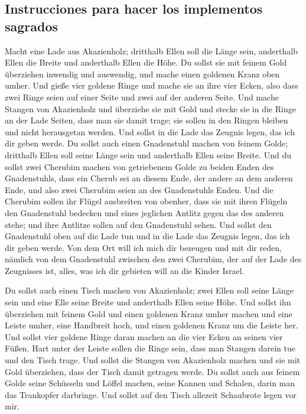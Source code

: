 \hypertarget{instrucciones-para-hacer-los-implementos-sagrados}{%
\subsection{Instrucciones para hacer los implementos
sagrados}\label{instrucciones-para-hacer-los-implementos-sagrados}}

 Macht eine Lade aus Akazienholz; dritthalb Ellen soll
die Länge sein, anderthalb Ellen die Breite und anderthalb Ellen die
Höhe.  Du sollst sie mit feinem Gold überziehen inwendig
und auswendig, und mache einen goldenen Kranz oben umher.
 Und gieße vier goldene Ringe und mache sie an ihre vier
Ecken, also dass zwei Ringe seien auf einer Seite und zwei auf der
anderen Seite.  Und mache Stangen von Akazienholz und
überziehe sie mit Gold  und stecke sie in die Ringe an
der Lade Seiten, dass man sie damit trage;  sie sollen in
den Ringen bleiben und nicht herausgetan werden.  Und
sollst in die Lade das Zeugnis legen, das ich dir geben werde.
 Du sollst auch einen Gnadenstuhl machen von feinem
Golde; dritthalb Ellen soll seine Länge sein und anderthalb Ellen seine
Breite.  Und du sollst zwei Cherubim machen von
getriebenem Golde zu beiden Enden des Gnadenstuhls,  dass
ein Cherub sei an diesem Ende, der andere an dem anderen Ende, und also
zwei Cherubim seien an des Gnadenstuhls Enden.  Und die
Cherubim sollen ihr Flügel ausbreiten von obenher, dass sie mit ihren
Flügeln den Gnadenstuhl bedecken und eines jeglichen Antlitz gegen das
des anderen stehe; und ihre Antlitze sollen auf den Gnadenstuhl sehen.
 Und sollst den Gnadenstuhl oben auf die Lade tun und in
die Lade das Zeugnis legen, das ich dir geben werde.  Von
dem Ort will ich mich dir bezeugen und mit dir reden, nämlich von dem
Gnadenstuhl zwischen den zwei Cherubim, der auf der Lade des Zeugnisses
ist, alles, was ich dir gebieten will an die Kinder Israel.

 Du sollst auch einen Tisch machen von Akazienholz; zwei
Ellen soll seine Länge sein und eine Elle seine Breite und anderthalb
Ellen seine Höhe.  Und sollst ihn überziehen mit feinem
Gold und einen goldenen Kranz umher machen  und eine
Leiste umher, eine Handbreit hoch, und einen goldenen Kranz um die
Leiste her.  Und sollst vier goldene Ringe daran machen
an die vier Ecken an seinen vier Füßen.  Hart unter der
Leiste sollen die Ringe sein, dass man Stangen darein tue und den Tisch
trage.  Und sollst die Stangen von Akazienholz machen und
sie mit Gold überziehen, dass der Tisch damit getragen werde.
 Du sollst auch aus feinem Golde seine Schüsseln und
Löffel machen, seine Kannen und Schalen, darin man das Trankopfer
darbringe.  Und sollst auf den Tisch allezeit Schaubrote
legen vor mir.

